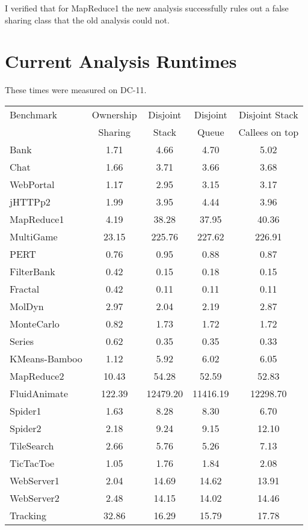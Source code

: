\documentclass{amsart}[9pt]
\begin{document}
I verified that for MapReduce1 the new analysis successfully rules out
a false sharing class that the old analysis could not.


\newpage

\section{Current Analysis Runtimes}
These times were measured on DC-11.

\begin{tabular}{|l|c|c|c|c|}
\hline
Benchmark     & Ownership & Disjoint & Disjoint & Disjoint Stack \\
              & Sharing   & Stack    & Queue    & Callees on top \\
\hline
Bank          &  1.71   & 4.66     & 4.70     &  5.02           \\
Chat          &  1.66   & 3.71     & 3.66     &  3.68           \\
WebPortal     &  1.17   & 2.95     & 3.15     &  3.17           \\
jHTTPp2       &  1.99   & 3.95     & 4.44     &  3.96           \\
MapReduce1    &  4.19   & 38.28    & 37.95    &  40.36          \\
MultiGame     &  23.15  & 225.76   & 227.62   &  226.91         \\
PERT          &  0.76   & 0.95     & 0.88     &  0.87           \\
FilterBank    &  0.42   & 0.15     & 0.18     &  0.15           \\
Fractal       &  0.42   & 0.11     & 0.11     &  0.11           \\
MolDyn        &  2.97   & 2.04     & 2.19     &  2.87           \\
MonteCarlo    &  0.82   & 1.73     & 1.72     &  1.72           \\
Series        &  0.62   & 0.35     & 0.35     &  0.33           \\
KMeans-Bamboo &  1.12   & 5.92     & 6.02     &  6.05           \\
MapReduce2    &  10.43  & 54.28    & 52.59    &  52.83          \\
FluidAnimate  &  122.39 & 12479.20 & 11416.19 &  12298.70       \\
Spider1       &  1.63   & 8.28     & 8.30     &  6.70           \\
Spider2       &  2.18   & 9.24     & 9.15     &  12.10          \\
TileSearch    &  2.66   & 5.76     & 5.26     &  7.13           \\
TicTacToe     &  1.05   & 1.76     & 1.84     &  2.08           \\
WebServer1    &  2.04   & 14.69    & 14.62    &  13.91          \\
WebServer2    &  2.48   & 14.15    & 14.02    &  14.46          \\
Tracking      &  32.86  & 16.29    & 15.79    &  17.78          \\
\hline
\end{tabular}
\end{document}
